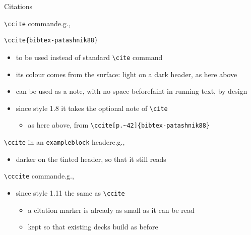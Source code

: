 \begin{frame}{Citations}
%
\begin{block}{\texttt{\textbackslash{}ccite} command\textemdash{}e.g., }
\begin{verbatim}
\ccite{bibtex-patashnik88}
\end{verbatim}
\begin{itemize}
	\item to be used instead of standard \texttt{\textbackslash{}cite} command
	\item its colour comes from the surface: light on a dark header, as here above
	\item can be used as a note, with no space before\textemdash{}faint in running text, by design
	\item since style 1.8 it takes the optional note of \texttt{\textbackslash{}cite}
	\begin{itemize}
		\item as here above, from \verb|\ccite[p.~42]{bibtex-patashnik88}|
	\end{itemize}
\end{itemize}
\end{block}
%
\begin{exampleblock}{\texttt{\textbackslash{}ccite} in an \texttt{exampleblock} header\textemdash{}e.g., }
\begin{itemize}
	\item darker on the tinted header, so that it still reads
\end{itemize}
\end{exampleblock}
%
\begin{alertblock}{\texttt{\textbackslash{}cccite} command\textemdash{}e.g., }
\begin{itemize}
	\item since style 1.11 the same as \texttt{\textbackslash{}ccite}
	\begin{itemize}
		\item a citation marker is already as small as it can be read
		\item kept so that existing decks build as before
	\end{itemize}
\end{itemize}
\end{alertblock}
%
\end{frame}
